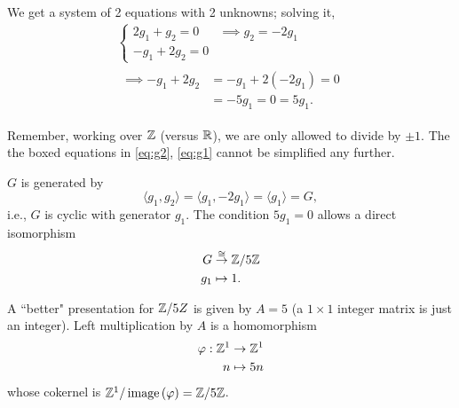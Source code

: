 \documentclass[../algebraNotesMSRI-UP2016.tex]{subfiles}
\begin{document}
\begin{frame}[c]
We get a system of 2 equations with 2 unknowns; solving it, 
\begin{align}
\left\{\begin{array}{rl}\label{eq:g2}
	2g_1+g_2=0 & \implies \boxed{g_2=-2g_1} \\
	-g_1+2g_2= 0 &
	\end{array}\right. \\
\begin{aligned}\label{eq:g1}
	\implies -g_1+2g_2 &= -g_1+2(-2g_1) = 0	\\
		&= -5g_1=\boxed{0=5g_1.} 	
	\end{aligned}
\end{align}
\end{frame}

\begin{frame}{}{}
Remember, working over $\mathbb Z$ (versus $\mathbb R$), we are only allowed to divide by $\pm 1$.  The the boxed equations in \eqref{eq:g2}, \eqref{eq:g1} cannot be simplified any further.  

\smallGap
$G$ is generated by  
\[
\langle g_1,g_2\rangle = \langle g_1,-2g_1\rangle = \langle g_1\rangle = G,
\]
i.e., $G$ is cyclic with generator $g_1$.  The condition $5g_1=0$ allows a direct isomorphism
\begin{align*}
G &\overset{\cong}{\to} \mathbb Z/5\mathbb Z \\
g_1 &\mapsto 1.
\end{align*}
\end{frame}

\begin{frame}[c] 
\begin{ex}
A ``better" presentation for $\mathbb Z/5Z$ is given by $A=5$ (a $1\times 1$ integer matrix is just an integer).  Left multiplication by $A$ is a homomorphism  
\begin{align*}
\varphi: \mathbb Z^1 &\to \mathbb Z^1 \\
 n &\mapsto 5n
\end{align*}  
whose cokernel is $\mathbb Z^1/\operatorname{image}{(\varphi)}=\mathbb Z/5\mathbb Z$.
\end{ex}
\end{frame}

\end{document}
